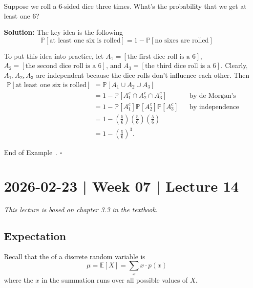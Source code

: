 \documentclass[10pt]{article}
\theoremstyle{definition}
\newtheorem{example}[theorem]{Example}
\renewenvironment{example}
{\begin{oldexample}}
  {\par\smallskip\hfill   End of Example~\theexample. $\square$    \par\end{oldexample}}
\newcommand{\vt}{\vskip 5mm} %
\newcommand{\Fl}{\vt\noindent\textbf} %
\newcommand{\1}[1]{\textbf{1}_{\left[#1\right]}} %
\def\E{\mathbb{E}} %
\def\P{\mathbb{P}} %
\newcommand{\dempfcolor}[1]{{\color{RoyalBlue}#1}}
\newcommand{\demph}[1]{\dempfcolor{{\sl \textbf{#1}}}}
\begin{document}
\begin{example}
  Suppose we roll a 6-sided dice three times. What's the probability that we
  get at least one 6?

  \Fl{Solution:} The key idea is the following
  \begin{equation*}
    \P\left[\text{at least one six is rolled} \right] = 1 - \P\left[\text{no
        sixes are rolled} \right]
  \end{equation*}

  To put this idea into practice, let
  $A_{1}= \left[ \text{the first dice roll is a 6} \right]$,
  $A_{2} = \left[ \text{the second dice roll is a 6} \right]$, and
  $A_{3}= \left[ \text{the third dice roll is a 6} \right]$. Clearly,
  $A_{1},A_{2},A_{3}$ are independent because the dice rolls don't influence
  each other. Then
  \begin{align*}
    \P\left[ \text{at least one six is rolled}\right] 
    &= \P\left[A_{1}\cup A_{2}\cup A_{3} \right]\\
    &= 1- \P\left[A_{1}^{c}\cap A_{2}^{c}\cap A_{3}^{c} \right] && \text{by de
                                                                   Morgan's law}\\
    &= 1 - \P\left[A_{1}^{c} \right] \P\left[A_{2}^{c} \right]
      \P\left[A_{3}^{c} \right] &&\text{by independence}\\
    &= 1 - \left( \frac{5}{6} \right) \left( \frac{5}{6} \right) \left( \frac{5}{6} \right)\\ 
    &= 1- \left( \frac{5}{6} \right)^{3}.
  \end{align*}
  
\end{example}

\newpage


\section{2026-02-23 | Week 07 | Lecture 14}
\textit{This lecture is based on chapter 3.3 in the textbook.}
\subsection{Expectation}
Recall that the \demph{expected value} of a discrete random variable is
\begin{equation*}
  \mu = \E\left[X \right] = \sum_{x} x\cdot p(x) 
\end{equation*}
where the $x$ in the summation runs over all possible values of $X$. 
\end{document}
